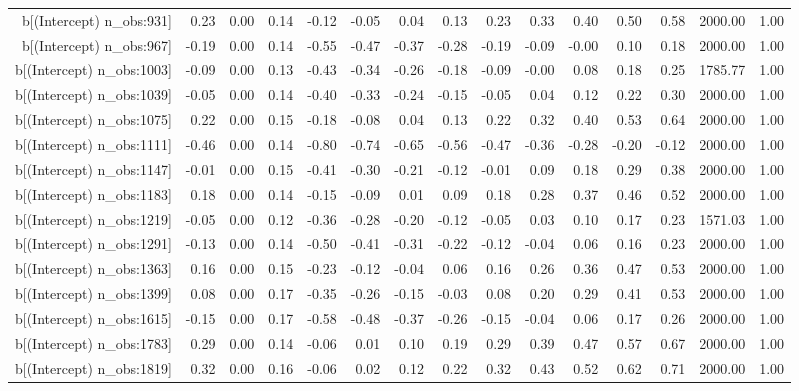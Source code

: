 \begin{table}[ht]
\begin{tabular}{rrrrrrrrrrrrrrr}
  b[(Intercept) n\_obs:931] & 0.23 & 0.00 & 0.14 & -0.12 & -0.05 & 0.04 & 0.13 & 0.23 & 0.33 & 0.40 & 0.50 & 0.58 & 2000.00 & 1.00 \\ 
  b[(Intercept) n\_obs:967] & -0.19 & 0.00 & 0.14 & -0.55 & -0.47 & -0.37 & -0.28 & -0.19 & -0.09 & -0.00 & 0.10 & 0.18 & 2000.00 & 1.00 \\ 
  b[(Intercept) n\_obs:1003] & -0.09 & 0.00 & 0.13 & -0.43 & -0.34 & -0.26 & -0.18 & -0.09 & -0.00 & 0.08 & 0.18 & 0.25 & 1785.77 & 1.00 \\ 
  b[(Intercept) n\_obs:1039] & -0.05 & 0.00 & 0.14 & -0.40 & -0.33 & -0.24 & -0.15 & -0.05 & 0.04 & 0.12 & 0.22 & 0.30 & 2000.00 & 1.00 \\ 
  b[(Intercept) n\_obs:1075] & 0.22 & 0.00 & 0.15 & -0.18 & -0.08 & 0.04 & 0.13 & 0.22 & 0.32 & 0.40 & 0.53 & 0.64 & 2000.00 & 1.00 \\ 
  b[(Intercept) n\_obs:1111] & -0.46 & 0.00 & 0.14 & -0.80 & -0.74 & -0.65 & -0.56 & -0.47 & -0.36 & -0.28 & -0.20 & -0.12 & 2000.00 & 1.00 \\ 
  b[(Intercept) n\_obs:1147] & -0.01 & 0.00 & 0.15 & -0.41 & -0.30 & -0.21 & -0.12 & -0.01 & 0.09 & 0.18 & 0.29 & 0.38 & 2000.00 & 1.00 \\ 
  b[(Intercept) n\_obs:1183] & 0.18 & 0.00 & 0.14 & -0.15 & -0.09 & 0.01 & 0.09 & 0.18 & 0.28 & 0.37 & 0.46 & 0.52 & 2000.00 & 1.00 \\ 
  b[(Intercept) n\_obs:1219] & -0.05 & 0.00 & 0.12 & -0.36 & -0.28 & -0.20 & -0.12 & -0.05 & 0.03 & 0.10 & 0.17 & 0.23 & 1571.03 & 1.00 \\ 
  b[(Intercept) n\_obs:1291] & -0.13 & 0.00 & 0.14 & -0.50 & -0.41 & -0.31 & -0.22 & -0.12 & -0.04 & 0.06 & 0.16 & 0.23 & 2000.00 & 1.00 \\ 
  b[(Intercept) n\_obs:1363] & 0.16 & 0.00 & 0.15 & -0.23 & -0.12 & -0.04 & 0.06 & 0.16 & 0.26 & 0.36 & 0.47 & 0.53 & 2000.00 & 1.00 \\ 
  b[(Intercept) n\_obs:1399] & 0.08 & 0.00 & 0.17 & -0.35 & -0.26 & -0.15 & -0.03 & 0.08 & 0.20 & 0.29 & 0.41 & 0.53 & 2000.00 & 1.00 \\ 
  b[(Intercept) n\_obs:1615] & -0.15 & 0.00 & 0.17 & -0.58 & -0.48 & -0.37 & -0.26 & -0.15 & -0.04 & 0.06 & 0.17 & 0.26 & 2000.00 & 1.00 \\ 
  b[(Intercept) n\_obs:1783] & 0.29 & 0.00 & 0.14 & -0.06 & 0.01 & 0.10 & 0.19 & 0.29 & 0.39 & 0.47 & 0.57 & 0.67 & 2000.00 & 1.00 \\ 
  b[(Intercept) n\_obs:1819] & 0.32 & 0.00 & 0.16 & -0.06 & 0.02 & 0.12 & 0.22 & 0.32 & 0.43 & 0.52 & 0.62 & 0.71 & 2000.00 & 1.00 \\ 

\end{tabular}
\end{table}
